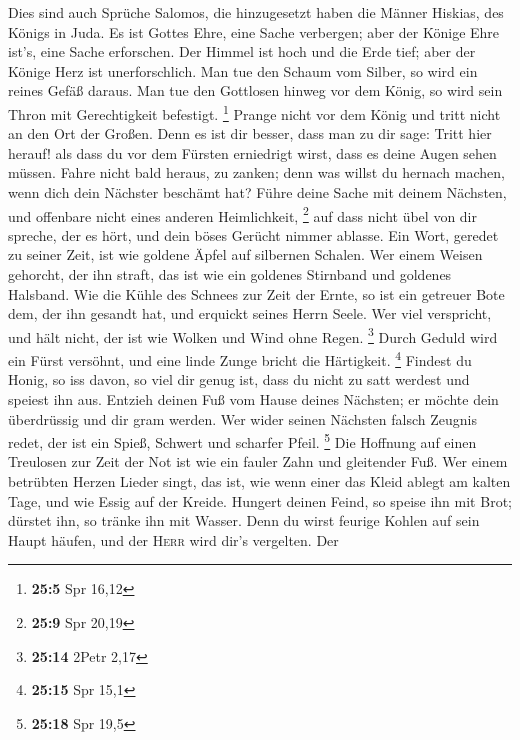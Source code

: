  Dies sind auch Sprüche Salomos, die hinzugesetzt haben
die Männer Hiskias, des Königs in Juda.  Es ist Gottes
Ehre, eine Sache verbergen; aber der Könige Ehre ist's, eine Sache
erforschen.  Der Himmel ist hoch und die Erde tief; aber
der Könige Herz ist unerforschlich.  Man tue den Schaum
vom Silber, so wird ein reines Gefäß daraus.  Man tue den
Gottlosen hinweg vor dem König, so wird sein Thron mit Gerechtigkeit
befestigt. \footnote{\textbf{25:5} Spr 16,12}  Prange
nicht vor dem König und tritt nicht an den Ort der Großen.
 Denn es ist dir besser, dass man zu dir sage: Tritt hier
herauf! als dass du vor dem Fürsten erniedrigt wirst, dass es deine
Augen sehen müssen.  Fahre nicht bald heraus, zu zanken;
denn was willst du hernach machen, wenn dich dein Nächster beschämt hat?
 Führe deine Sache mit deinem Nächsten, und offenbare
nicht eines anderen Heimlichkeit, \footnote{\textbf{25:9} Spr 20,19}
 auf dass nicht übel von dir spreche, der es hört, und
dein böses Gerücht nimmer ablasse.  Ein Wort, geredet zu
seiner Zeit, ist wie goldene Äpfel auf silbernen Schalen.
 Wer einem Weisen gehorcht, der ihn straft, das ist wie
ein goldenes Stirnband und goldenes Halsband.  Wie die
Kühle des Schnees zur Zeit der Ernte, so ist ein getreuer Bote dem, der
ihn gesandt hat, und erquickt seines Herrn Seele.  Wer
viel verspricht, und hält nicht, der ist wie Wolken und Wind ohne Regen.
\footnote{\textbf{25:14} 2Petr 2,17}  Durch Geduld wird
ein Fürst versöhnt, und eine linde Zunge bricht die Härtigkeit.
\footnote{\textbf{25:15} Spr 15,1}  Findest du Honig, so
iss davon, so viel dir genug ist, dass du nicht zu satt werdest und
speiest ihn aus.  Entzieh deinen Fuß vom Hause deines
Nächsten; er möchte dein überdrüssig und dir gram werden.
 Wer wider seinen Nächsten falsch Zeugnis redet, der ist
ein Spieß, Schwert und scharfer Pfeil. \footnote{\textbf{25:18} Spr 19,5}
 Die Hoffnung auf einen Treulosen zur Zeit der Not ist
wie ein fauler Zahn und gleitender Fuß.  Wer einem
betrübten Herzen Lieder singt, das ist, wie wenn einer das Kleid ablegt
am kalten Tage, und wie Essig auf der Kreide.  Hungert
deinen Feind, so speise ihn mit Brot; dürstet ihn, so tränke ihn mit
Wasser.  Denn du wirst feurige Kohlen auf sein Haupt
häufen, und der \textsc{Herr} wird dir's vergelten.  Der
